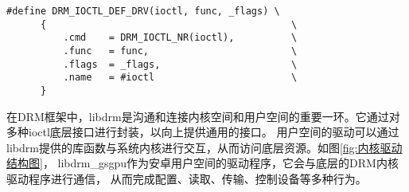 \begin{lstlisting}[caption={DRM驱动IOCTL定义宏}, label={lst:drm-ioctl-drv}, escapechar=@]
  #define DRM_IOCTL_DEF_DRV(ioctl, func, _flags) \
      {                                           \
          .cmd    = DRM_IOCTL_NR(ioctl),          \
          .func   = func,                         \
          .flags  = _flags,                       \
          .name   = #ioctl                        \
      }
  \end{lstlisting}
  




在DRM框架中，libdrm是沟通和连接内核空间和用户空间的重要一环。它通过对多种ioctl底层接口进行封装，以向上提供通用的接口。
用户空间的驱动可以通过libdrm提供的库函数与系统内核进行交互，从而访问底层资源。如图\ref{fig:内核驱动结构图}，
libdrm\_gsgpu作为安卓用户空间的驱动程序，它会与底层的DRM内核驱动程序进行通信，
从而完成配置、读取、传输、控制设备等多种行为。

